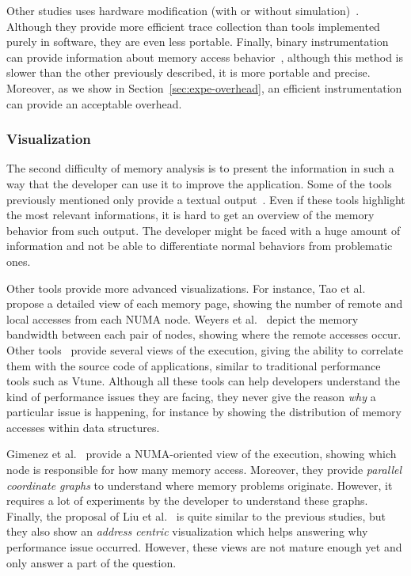 Other studies uses hardware modification (with or without simulation)~\cite{Bao08HMTT,Martonosi92MemSpy}.
Although they provide more efficient trace collection than tools implemented purely in software, they are even less portable.
Finally, binary instrumentation can provide information about memory access behavior~\cite{DeRose02SIGMA}, although this method is slower than
the other previously described, it is more portable and precise. Moreover, as
we show in Section~\ref{sec:expe-overhead}, an efficient instrumentation can
provide an acceptable overhead.

\subsubsection{Visualization}

The second difficulty of memory analysis is to present the information in such
a way that the developer can use it to improve the application. Some of the tools
previously mentioned only provide a textual
output~\cite{Lachaize12MemProf,McCurdy2010,Martonosi92MemSpy}. Even if these
tools highlight the most relevant informations, it is hard to get an overview
of the memory behavior from such output. The developer might be faced with a huge
amount of information and not be able to differentiate normal behaviors from
problematic ones.


Other tools provide more advanced visualizations. For
instance, Tao et al.~\cite{Tao01Visualizing} propose a detailed view of each memory
page, showing the number of remote and local accesses from each NUMA node. Weyers et
al.~\cite{Weyers14Visualization} depict the memory bandwidth between each pair of nodes,
showing where the remote accesses occur. Other
tools~\cite{DeRose01Hardware,DeRose02SIGMA,Bosch00Rivet} provide several views
of the execution, giving the ability to correlate them with the source code of applications, similar to traditional performance tools such as Vtune. Although
all these tools can help developers understand the kind of
performance issues they are facing, they never give the reason \emph{why} a particular
issue is happening, for instance by showing the distribution of memory accesses within data structures.

Gimenez et al.~\cite{Gimenez14Dissecting} provide a NUMA-oriented view of the
execution, showing which node is responsible for how many memory access.
Moreover, they provide \emph{parallel coordinate graphs} to understand where memory
problems originate. However, it requires a lot of experiments by the developer to
understand these graphs.
Finally, the proposal of Liu et al.~\cite{Liu14Tool} is quite similar to the previous studies, but
they also show an \emph{address centric} visualization which helps answering
why performance issue occurred. However, these views are not mature enough
yet and only answer a part of the question.

